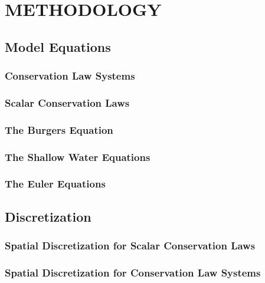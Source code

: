 \chapter{METHODOLOGY}

\section{Model Equations}
\subsection{Conservation Law Systems}
  
\subsection{Scalar Conservation Laws}
  
\subsection{The Burgers Equation}
%  
\subsection{The Shallow Water Equations\label{sec:shallowwater}}
  
\subsection{The Euler Equations}
%  
\section{Discretization}
\subsection{Spatial Discretization for Scalar Conservation Laws
  \label{sec:spatial_discretization_scalar}}
  
\subsection{Spatial Discretization for Conservation Law Systems
  \label{sec:spatial_discretization_system}}
  
